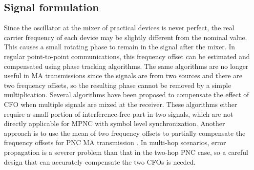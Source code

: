 \subsection{Signal formulation}
Since the oscillator at the mixer of practical devices is never perfect, the real carrier frequency of each device may be slightly different from the nominal value. This causes a small rotating phase to remain in the signal after the mixer. In regular point-to-point communications,  this frequency offset can be estimated and compensated using phase tracking algorithms. The same algorithms are no longer useful in MA transmissions since the signals are from two sources and there are two frequency offsets, so the resulting phase cannot be removed by a simple multiplication. 
Several algorithms have been proposed \cite{lu2013implementation,katti2007embracing, gollakota2008zigzag, fung2010preamble} to compensate the effect of CFO when multiple signals are mixed at the receiver. These algorithms either require a small portion of interference-free part in two signals, which are not directly applicable for MPNC with symbol level synchronization. Another approach is to use the mean of two frequency offsets to partially compensate the frequency offsets for PNC MA transmission \cite{lu2013implementation}. In multi-hop scenarios, error propagation is a severer problem than that in the two-hop PNC case,  so a careful design that can accurately compensate the two CFOs is needed.

